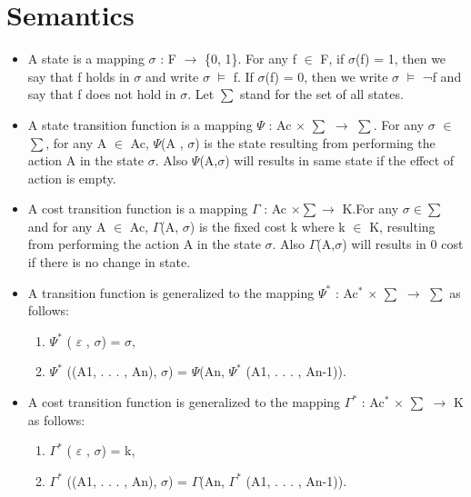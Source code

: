 \documentclass[11pt]{article}
\begin{document}
	\section{Semantics}
	\begin{itemize}
\item 	A state is a mapping $\sigma$ : F $\rightarrow$ \{0, 1\}. For any f $\in$ F, if $\sigma$(f) = 1, then we say that f holds in $\sigma$ and write $\sigma$   $\vDash$   f. If $\sigma$(f) = 0, then we write $\sigma$   $\vDash$   ¬f and say that f does not hold in $\sigma$. Let $\sum$ stand for the set of all states.

\item 	A state transition function is a mapping $\Psi$ : Ac $\times$ $\sum$ $\rightarrow$ $\sum$. For any $\sigma$ $\in$ $\sum$, for any A $\in$ Ac, $\Psi$(A , $\sigma$) is the state resulting from performing the action A in the state $\sigma$. Also $\Psi$(A,$\sigma$) will results in same state if the effect of action is empty.

\item A cost transition function is a mapping $\Gamma$ : Ac $\times \sum \rightarrow$ K.For any $\sigma\in\sum$ and for any A $\in$ Ac, $\Gamma$(A, $\sigma$) is the fixed cost k where k $\in$ K, resulting from performing the action A in the state $\sigma$. Also $\Gamma$(A,$\sigma$) will results in 0 cost if there is no change in state. 


\item 	A transition function is generalized to the mapping $\Psi^{\ast}$ : Ac$^{\ast}$  $\times$  $\sum$ $\rightarrow$ $\sum$ as follows: 
\begin{enumerate}

\item $\Psi^{\ast}$ ( $\varepsilon$ , $\sigma$) = $\sigma$,
 
\item $\Psi^{\ast}$ ((A1, . . . , An), $\sigma$) = $\Psi$(An, $\Psi^{\ast}$ (A1, . . . , An-1)). 

\end{enumerate}
 
\item A cost transition function is generalized to the mapping $\Gamma^{\ast}$ : Ac$^{\ast}$  $\times$  $\sum$ $\rightarrow$ K as follows: 
\begin{enumerate}

\item $\Gamma^{\ast}$ ( $\varepsilon$ , $\sigma$) = k,
 
\item $\Gamma^{\ast}$ ((A1, . . . , An), $\sigma$) = $\Gamma$(An, $\Gamma^{\ast}$ (A1, . . . , An-1)). 


\end{enumerate}
\end{itemize}
\end{document}
